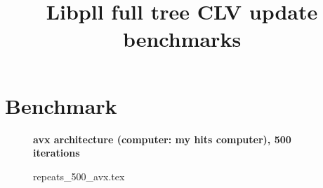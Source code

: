 \documentclass[a4paper]{article}
\begin{document}
\newcommand*{\figuretitle}[1]{%
    {\centering%
    \textbf{#1}%
    \par\medskip}%
}


\title{Libpll full tree CLV update benchmarks}
\maketitle



\section{Benchmark}


\begin{figure}[!htb]
\figuretitle{avx architecture (computer: my hits computer), 500 iterations}
{repeats_500_avx.tex}
\end{figure}
\end{document}

